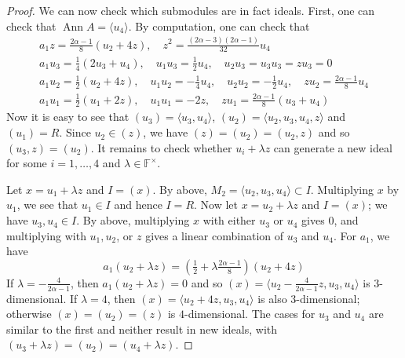 \documentclass[11pt, a4paper]{article}
\theoremstyle{plain}
\theoremstyle{definition}
\newcommand\al{\alpha}
\newcommand\lm{\lambda}
\newcommand\la{\langle}
\newcommand\ra{\rangle}
\DeclareMathOperator{\Ann}{Ann}
\newcommand\FF{\mathbb{F}}
\newcommand{\0}{\overline{0}}
\newcommand{\2}{\overline{2}}
\newcommand{\1}{\mathbbm{1}}
\begin{document}
\begin{proof}
We can now check which submodules are in fact ideals.  First, one can check that $\Ann A = \la u_4 \ra$.  By computation, one can check that
\begin{gather*}%
a_1 z = \tfrac{2\al-1}{8}(u_2+4z), \quad 
z^2 = \tfrac{(2\al-3)(2\al-1)}{32}u_4 \\
%
a_1u_3 = \tfrac{1}{4}(2u_3 + u_4), \quad u_1 u_3 = \tfrac{1}{2}u_4, \quad u_2 u_3 = u_3 u_3 = z u_3 = 0 \\
%
a_1 u_2 = \tfrac{1}{2}( u_2 + 4z), \quad 
u_1 u_2 = -\tfrac{1}{4} u_4, \quad
u_2 u_2 =  -\tfrac{1}{2} u_4, \quad
z u_2 = \tfrac{2\al-1}{8}u_4 \\
%
a_1 u_1 = \tfrac{1}{2}(u_1 + 2z), \quad
u_1 u_1 = -2 z, \quad
z u_1 = \tfrac{2\al-1}{8}(u_3+u_4)
\end{gather*}
Now it is easy to see that $( u_3 ) = \la u_3, u_4 \ra$, $(u_2) = \la u_2, u_3, u_4, z \ra$ and $(u_1) = R$.  Since $u_2 \in (z)$, we have $(z) = (u_2) = (u_2,z)$ and so $(u_3,z) = (u_2)$.  It remains to check whether $u_i + \lm z$ can generate a new ideal for some $i = 1, \dots, 4$ and $\lm \in \FF^\times$.

Let $x = u_1 + \lm z$ and $I = (x)$.  By above, $M_2 = \la u_2, u_3, u_4 \ra \subset I$.  Multiplying $x$ by $u_1$, we see that $u_1 \in I$ and hence $I = R$.  Now let $x = u_2 + \lm z$ and $I = (x)$; we have $u_3,u_4 \in I$.  By above, multiplying $x$ with either $u_3$ or $u_4$ gives $0$, and multiplying with $u_1, u_2$, or $z$ gives a linear combination of $u_3$ and $u_4$.  For $a_1$, we have
\[
a_1(u_2 + \lm z) = (\tfrac{1}{2} + \lm \tfrac{2\al-1}{8})( u_2 + 4z)
\]
If $\lm = -\tfrac{4}{2\al-1}$, then $a_1(u_2 + \lm z) = 0$ and so $(x) = \la u_2 -\tfrac{4}{2\al-1}z, u_3, u_4 \ra$ is $3$-dimensional.  If $\lm = 4$, then $(x) = \la u_2+4z, u_3, u_4 \ra$ is also $3$-dimensional; otherwise $(x) = (u_2) = (z)$ is $4$-dimensional.  The cases for $u_3$ and $u_4$ are similar to the first and neither result in new ideals, with $(u_3 + \lm z) = (u_2) = (u_4 + \lm z)$.


\end{proof}
\end{document}
